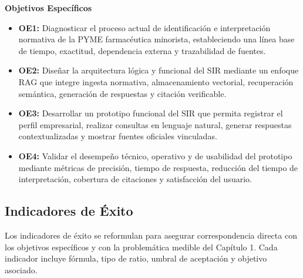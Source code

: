 \documentclass[12pt,a4paper,oneside]{report}
\begin{document}
\textbf{Objetivos Específicos}

\begin{itemize}
\item \textbf{OE1:} Diagnosticar el proceso actual de identificación e interpretación normativa de la PYME farmacéutica minorista, estableciendo una línea base de tiempo, exactitud, dependencia externa y trazabilidad de fuentes.
\item \textbf{OE2:} Diseñar la arquitectura lógica y funcional del SIR mediante un enfoque RAG que integre ingesta normativa, almacenamiento vectorial, recuperación semántica, generación de respuestas y citación verificable.
\item \textbf{OE3:} Desarrollar un prototipo funcional del SIR que permita registrar el perfil empresarial, realizar consultas en lenguaje natural, generar respuestas contextualizadas y mostrar fuentes oficiales vinculadas.
\item \textbf{OE4:} Validar el desempeño técnico, operativo y de usabilidad del prototipo mediante métricas de precisión, tiempo de respuesta, reducción del tiempo de interpretación, cobertura de citaciones y satisfacción del usuario.
\end{itemize}

\subsection{Indicadores de Éxito}\label{subsec:indicadores-de-exito}

Los indicadores de éxito se reformulan para asegurar correspondencia directa con los objetivos específicos y con la problemática medible del Capítulo 1. Cada indicador incluye fórmula, tipo de ratio, umbral de aceptación y objetivo asociado.
\end{document}
